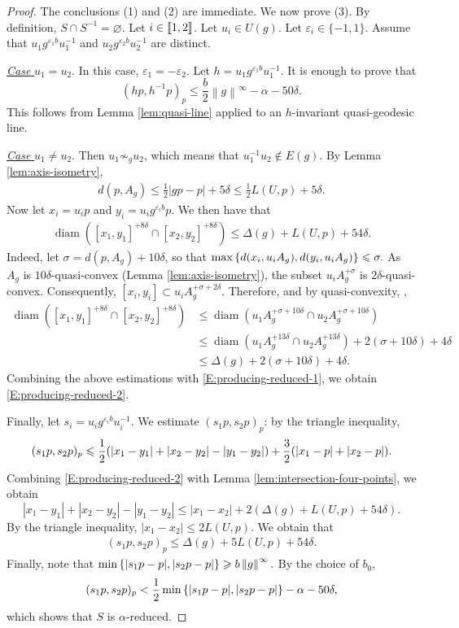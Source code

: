 \documentclass[leqno,a4paper,10pt]{amsart}
\theoremstyle{plain}
\theoremstyle{definition}
\theoremstyle{remark}
\DeclareMathOperator{\diam}{diam}
\let\le\leqslant
\let\ge\geqslant
\newcommand{\zinterval}[2]{
	\mathchoice%
	{\left \llbracket #1, \cdots, #2 \right \rrbracket}%
	{\llbracket #1, #2 \rrbracket}%
	{\llbracket #1, #2 \rrbracket}%
	{\llbracket #1, #2 \rrbracket}%
}
\newcommand{\stlen}[1]{
	\left\| #1\right\|^{\infty}
}
\begin{document}
\begin{proof}
	The conclusions (1) and (2) are immediate. We now prove (3). By definition, $S\cap S^{-1} = \varnothing$. Let $i\in\zinterval{1}{2}$. Let $u_i\in U(g)$. Let $\varepsilon_i\in \{-1,1\}$. Assume that $u_1g^{\varepsilon_1b}u_1^{-1}$ and $u_2g^{\varepsilon_2b}u_2^{-1}$ are distinct.
	
	\underline{\emph{Case} $u_1=u_2$}. In this case, $\varepsilon_1=-\varepsilon_2$. Let $h=u_1g^{\varepsilon_1b}u_1^{-1}$. It is enough to prove that
	$$(hp,h^{-1}p)_p\le \frac{b}{2}\stlen{g}-\alpha-50\delta.$$
	This follows from Lemma \ref{lem:quasi-line} applied to an $h$-invariant quasi-geodesic line.  
	
	
	\underline{\emph{Case} $u_1\neq u_2$}. Then $u_1\not\sim_g u_2$, which means that $u_1^{-1}u_2\not \in E(g)$. By 
 Lemma \ref{lem:axis-isometry},
\begin{align}
d(p,A_g)\le \frac{1}{2}|gp-p|+5\delta\le \frac{1}{2}L(U,p)+5\delta. \label{E:producing-reduced-1}
\end{align}		
		Now let $x_i = u_ip$ and $y_i = u_ig^{\varepsilon_ib}p$. We then have that 
\begin{align}
\diam([x_1,y_1]^{+8\delta}\cap[x_2,y_2]^{+8\delta})\le \Delta(g)+L(U,p)+54\delta. \label{E:producing-reduced-2}
\end{align}
Indeed, let $\sigma=d(p,A_g)+10 \delta$, so that  
		$\max \qty {d(x_i,u_iA_g), d(y_i, u_iA_g)}\le \sigma.$
		As $A_g$ is $10\delta$-quasi-convex (Lemma \ref{lem:axis-isometry}), the subset $u_iA_g^{+\sigma}$ is $2\delta$-quasi-convex. Consequently, 	
		$[x_i,y_i]\subset u_iA_g^{+\sigma+2\delta}.$
		Therefore,  and by quasi-convexity, {\cite[Lemma~2.2.2~(2)]{delzant_courbure_2008}},
		\begin{align*}
		\diam([x_1,y_1]^{+8\delta}\cap[x_2,y_2]^{+8\delta}) & \le \diam(u_1A_g^{+\sigma+10\delta}\cap u_2A_g^{+\sigma+10\delta})\\
		& \le \diam(u_1A_g^{+13\delta}\cap u_2A_g^{+13\delta})+2(\sigma+10\delta)+4\delta \\
		& \le \Delta(g)+2(\sigma+10\delta)+4\delta.
		\end{align*}
 Combining the above estimations with \eqref{E:producing-reduced-1}, we obtain \eqref{E:producing-reduced-2}.
	
	Finally, let $s_i=u_ig^{\varepsilon_ib}u_i^{-1}$. We estimate $(s_1p,s_2p)_p$:
		by the triangle inequality, 
		$$(s_1p,s_2p)_p \le \frac{1}{2} \qty (|x_1-y_1|+|x_2-y_2|-|y_1-y_2|)+\frac{3}{2} \qty (|x_1-p|+|x_2-p|).$$
		Combining \eqref{E:producing-reduced-2} with Lemma \ref{lem:intersection-four-points}, we obtain
		$$|x_1-y_1|+|x_2-y_2|-|y_1-y_2| \le |x_1-x_2|+2(\Delta(g)+L(U,p)+54\delta).$$
		By the triangle inequality,
		$|x_1-x_2| \le 2 L(U,p).$
		 We obtain that 
		\begin{align} \label{E:producing-reduced-3}
		(s_1p,s_2p)_p\le \Delta(g)+5L(U,p)+54\delta.
		\end{align}
	Finally, note that
$
\min \qty { |s_1p-p|, |s_2p-p| }  \ge {b}\stlen{g}.
$
	By the choice of $b_0$, 
	$$(s_1p,s_2p)_p<\frac{1}{2} \min \qty { |s_1p-p|, |s_2p-p| }-\alpha-50\delta,$$
	which shows that $S$ is $\alpha$-reduced. 	
\end{proof}
\end{document}
